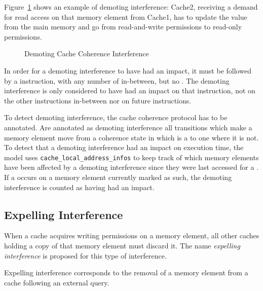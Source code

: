 \begin{example}
Figure~\ref{fig:demoting-interference} shows an example of
demoting interference: Cache2, receiving
a demand for read access on that memory element from Cache1, has to update the
value from the main memory and go from read-and-write permissions to read-only
permissions.

\begin{figure}[hbt!]
\begin{center}
\end{center}
\caption{Demoting Cache Coherence Interference}
\label{fig:demoting-interference}
\end{figure}
\end{example}

In order for a demoting interference to have had an impact, it must be followed
by a \storeinstr{} instruction, with any number of \loadinstr{} in-between, but
no \evictinstr{}. The demoting interference is only considered to have had an
impact on that \storeinstr{} instruction, not on the other instructions
in-between nor on future instructions.

To detect demoting interference, the cache coherence protocol has to be
annotated. Are annotated as demoting interference all transitions which make a
memory element move from a coherence state in which \storeinstr{} is a \hitact{}
to one where it is not. To detect that a demoting interference had an impact on
execution time, the model uses \lstinline!cache_local_address_infos! to keep
track of which memory elements have been affected by a demoting interference
since they were last accessed for a \storeinstr{}. If a \storeinstr{} occurs on
a memory element currently marked as such, the demoting interference is counted
as having had an impact.

\subsection{Expelling Interference}
When a cache acquires writing permissions on a memory element, all other
caches holding a copy of that memory element must discard it. The name
\textit{expelling interference} is proposed for this type of interference.

\begin{definition}
Expelling interference corresponds to the removal of a memory element from a
cache following an external query.
\end{definition}

